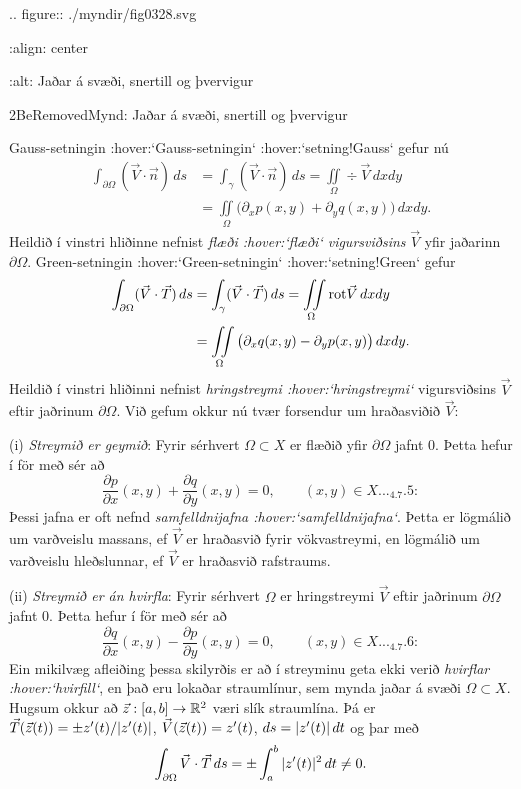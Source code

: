 .. figure:: ./myndir/fig0328.svg

    :align: center

    :alt: Jaðar á svæði, snertill og þvervigur

    2BeRemovedMynd: Jaðar á svæði, snertill og þvervigur


\noindent
Gauss-setningin :hover:`Gauss-setningin` :hover:`setning!Gauss` gefur nú
\begin{align*}
\int_{\partial\Omega}(\vec V\cdot\vec n)\, ds
&=\int_{{\gamma}}(\vec V\cdot\vec n)\, ds
=\iint\limits_{{\Omega}} \div \vec V\, dxdy\\
&=\iint\limits_{{\Omega}}
\big({\partial}_xp(x,y)+{\partial}_yq(x,y)\big)\, dxdy.\nonumber
\end{align*}
Heildið í vinstri hliðinne nefnist {\it flæði :hover:`flæði`
vigursviðsins} $\vec
V$ yfir jaðarinn ${\partial}{\Omega}$.
Green-setningin :hover:`Green-setningin` :hover:`setning!Green` gefur
\begin{align*}
\int_{\partial\Omega}(\vec V\cdot\vec T)\, ds
&=\int_{{\gamma}}(\vec V\cdot\vec T)\, ds
=\iint\limits_{{\Omega}} {\operatorname{rot}} \vec V\, dxdy\\
&=\iint\limits_{{\Omega}}
\big({\partial}_xq(x,y)-{\partial}_yp(x,y)\big)\, dxdy.\nonumber
\end{align*}
Heildið í vinstri hliðinni  nefnist 
{\it hringstreymi :hover:`hringstreymi`} vigursviðsins $\vec V$ eftir jaðrinum
${\partial}{\Omega}$.  
Við gefum okkur nú tvær forsendur um hraðasviðið $\vec V$:

\smallskip\noindent
(i) {\it Streymið er geymið}:  Fyrir sérhvert ${\Omega}\subset X$ er
flæðið yfir ${\partial}{\Omega}$ jafnt $0$.  Þetta hefur
í för með sér að
\begin{equation*}
\dfrac{\partial p}{\partial x}(x,y)+
\dfrac{\partial q}{\partial y}(x,y)=0, \qquad (x,y)\in X.


.. _4.7.5:

\end{equation*}
Þessi jafna er oft nefnd {\it
samfelldnijafna :hover:`samfelldnijafna`}. 
Þetta er lögmálið um varðveislu massans, ef $\vec V$ er hraðasvið fyrir
vökvastreymi, en lögmálið um varðveislu hleðslunnar, ef $\vec V$ er
hraðasvið rafstraums.  

\smallskip\noindent
(ii) {\it Streymið er án hvirfla}:  Fyrir sérhvert ${\Omega}$ er
hringstreymi $\vec V$ eftir jaðrinum ${\partial}{\Omega}$ jafnt $0$.  
Þetta  hefur í för með sér að 
\begin{equation*}
\dfrac{\partial q}{\partial x}(x,y)-
\dfrac{\partial p}{\partial y}(x,y)=0, \qquad (x,y)\in X.


.. _4.7.6:

\end{equation*}
Ein mikilvæg afleiðing þessa skilyrðis er að í streyminu geta ekki verið
{\it hvirflar :hover:`hvirfill`}, en það eru lokaðar straumlínur, sem
mynda jaðar á svæði ${\Omega}\subset X$.  Hugsum okkur að
$\vec z:[a,b]\to {\mathbb R}^2$ væri slík straumlína. Þá er
$\vec T(\vec z(t))=\pm z{\sp{\prime}}(t)/|z{\sp{\prime}}(t)|$, 
$\vec V(\vec z(t))= z{\sp{\prime}}(t)$, $ds=|z{\sp{\prime}}(t)|\, dt$ og þar með
$$
\int_{{\partial}{\Omega}} \vec V\cdot \vec T\, ds =
\pm\int_a^b |z{\sp{\prime}}(t)|^2\, dt \neq 0.
$$

